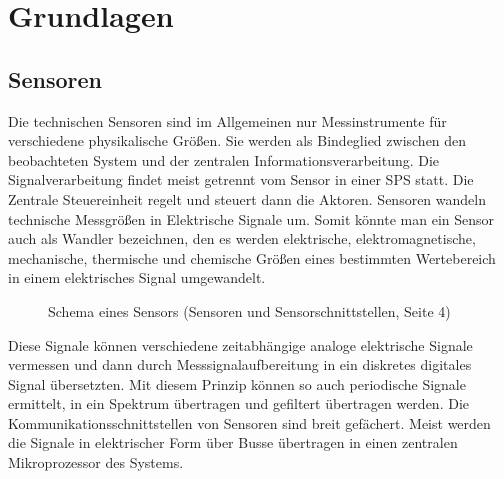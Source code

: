 \documentclass[a4paper,12pt]{scrartcl}
\begin{document}
\section{Grundlagen}

\subsection{Sensoren}
Die technischen Sensoren sind im Allgemeinen nur Messinstrumente für verschiedene physikalische Größen. Sie werden als Bindeglied zwischen den beobachteten System und der zentralen Informationsverarbeitung. Die Signalverarbeitung findet meist getrennt vom Sensor in einer SPS statt. Die Zentrale Steuereinheit regelt und steuert dann die Aktoren.
Sensoren wandeln technische Messgrößen in Elektrische Signale um. Somit könnte man ein Sensor auch als Wandler bezeichnen, den es werden elektrische, elektromagnetische, mechanische, thermische und chemische Größen eines bestimmten Wertebereich in einem elektrisches Signal umgewandelt. \cite[Seite 4]{Huning} %
\vspace{0.5cm}
\begin{figure}[H]
\centering 
{}
  \caption{Schema eines Sensors (Sensoren und Sensorschnittstellen, Seite 4)}
 \label{fig:Schema eines Sensors} 
\end{figure}

Diese Signale können verschiedene zeitabhängige analoge elektrische Signale vermessen und dann durch Messsignalaufbereitung in ein diskretes digitales Signal übersetzten. Mit diesem Prinzip können so auch periodische Signale ermittelt, in ein Spektrum übertragen und gefiltert übertragen werden. Die Kommunikationsschnittstellen von Sensoren sind breit gefächert. Meist werden die Signale in elektrischer Form über Busse übertragen in einen zentralen Mikroprozessor des Systems. \cite{[1] Seite 9}
\vspace{0.5cm}
\end{document}
